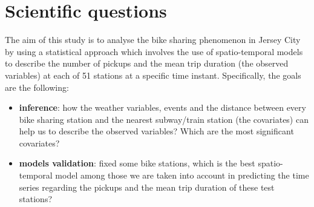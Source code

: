\section{Scientific questions}

The aim of this study is to analyse the bike sharing phenomenon in Jersey City by using a statistical approach which involves the use of spatio-temporal models to describe the number of pickups and the mean trip duration (the observed variables) at each of \num{51} stations at a specific time instant. Specifically, the goals are the following:
\begin{itemize}
	\item \textbf{inference}: how the weather variables, events and the distance between every bike sharing station and the nearest subway/train station (the covariates) can help us to describe the observed variables? Which are the most significant covariates?
	\item \textbf{models validation}: fixed some bike stations, which is the best spatio-temporal model among those we are taken into account in predicting the time series regarding the pickups and the mean trip duration of these test stations?
\end{itemize}